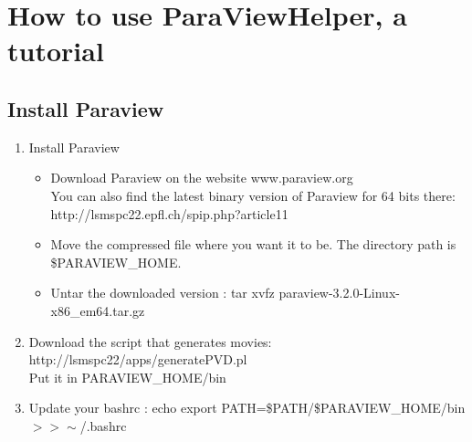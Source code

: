 %
%
%
%

\chapter{How to use ParaViewHelper, a tutorial}

\section{Install Paraview}
	\begin{enumerate}
	\item Install Paraview
		\begin {itemize}
		\item Download Paraview on the website www.paraview.org 
		\\ You can also find the latest binary version of Paraview for 64 bits there: http://lsmspc22.epfl.ch/spip.php?article11
		\item Move the compressed file where you want it to be. The directory path is \$PARAVIEW\_HOME.
		\item Untar the downloaded version : tar xvfz paraview-3.2.0-Linux-x86\_em64.tar.gz
		\end {itemize}
	\item Download the script that generates movies: http://lsmspc22/apps/generatePVD.pl 
	\\Put it in PARAVIEW\_HOME/bin
	\item Update your bashrc : echo export PATH=\$PATH/\$PARAVIEW\_HOME/bin $>>\sim$/.bashrc
	\end{enumerate}

